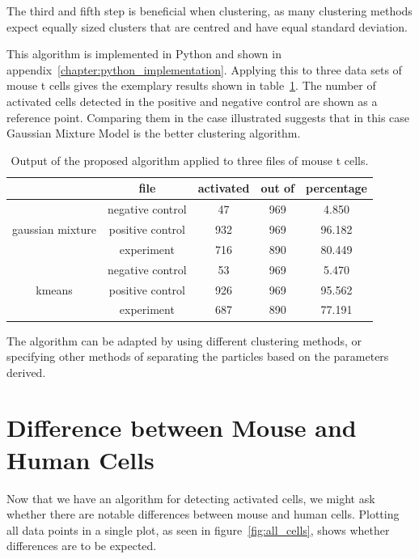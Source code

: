 The third and fifth step is beneficial when clustering, as many clustering methods expect equally sized clusters that are centred and have equal standard deviation. 

This algorithm is implemented in Python and shown in appendix~\ref{chapter:python_implementation}. Applying this to three data sets of mouse t cells gives the exemplary results shown in table~\ref{tab:results_main_algorithm}. The number of activated cells detected in the positive and negative control are shown as a reference point. Comparing them in the case illustrated suggests that in this case Gaussian Mixture Model is the better clustering algorithm.

\begin{table}[h]
	\centering
	\begin{tabular}{|c|c|c|c|c|}
		\hline
		 & file & activated & out of & percentage\\
		 \hline
		  & negative control & 47 & 969 & 4.850\\
		 gaussian mixture & positive control & 932 & 969 & 96.182\\
		  & experiment & 716 & 890 & 80.449\\
		 \hline
		  & negative control & 53 & 969 & 5.470\\
		 kmeans & positive control & 926 & 969 & 95.562\\
		  & experiment & 687 & 890 & 77.191\\
		 \hline
	\end{tabular}
	\caption{Output of the proposed algorithm applied to three files of mouse t cells.}
	\label{tab:results_main_algorithm}
\end{table}

The algorithm can be adapted by using different clustering methods, or specifying other methods of separating the particles based on the parameters derived.

\section{Difference between Mouse and Human Cells}
\label{sec:differences_between_mouse_and_human_cells}

Now that we have an algorithm for detecting activated cells, we might ask whether there are notable differences between mouse and human cells. Plotting all data points in a single plot, as seen in figure~\ref{fig:all_cells}, shows whether differences are to be expected.

